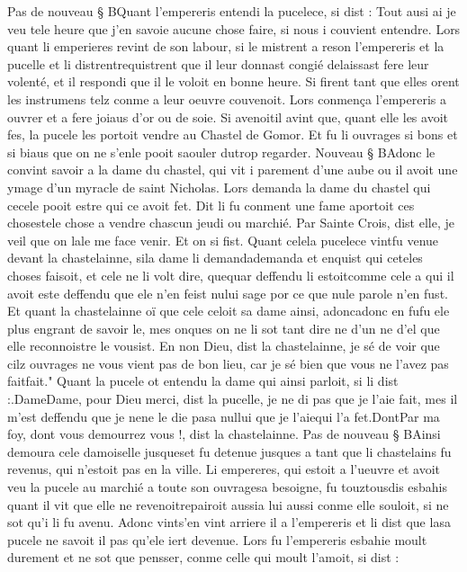 \documentclass{article}
\begin{document}
\begin{pages}
\pstart Pas de nouveau § BQuant l’empereris 
   entendi la pucelece, si dist :
   Tout ausi ai je veu tele heure que j’en savoie 
      aucune chose faire, si nous i couvient entendre.
   Lors quant li emperieres revint de son labour, si le mistrent a reson 
   l’empereris 
      et la pucelle 
   et li 
   distrentrequistrent que 
   il leur donnast congié delaissast fere leur 
      volenté, et il respondi que il le voloit 
         en bonne heure. Si firent tant que elles orent les instrumens telz 
   conme a leur oeuvre couvenoit. 
   Lors conmença l’empereris a ouvrer et a fere joiaus d’or ou de soie. 
   Si avenoitil avint que, quant elle les avoit fes, 
   la pucele les portoit vendre au Chastel de Gomor. 
   Et fu li ouvrages si bons et si biaus que on ne s’enle pooit 
   saouler dutrop regarder. 
   Nouveau § BAdonc le convint savoir a 
   la dame du chastel,
   qui vit i parement d’une aube ou il avoit une ymage d’un myracle de 
   saint Nicholas. Lors demanda la dame du chastel
   qui cecele pooit estre qui ce avoit fet. 
   Dit li fu conment une fame aportoit 
      ces chosestele chose 
      a vendre chascun jeudi ou marchié.
   Par Sainte Crois, dist elle, je veil que on lale 
      me face venir. Et on si fist. Quant celela pucelece 
   vintfu venue devant la chastelainne, 
   sila dame li 
   demandademanda et enquist 
   qui ceteles choses faisoit, 
   et cele ne li volt dire, quequar 
      deffendu li estoitcomme cele a qui il avoit este deffendu
   que ele n'en feist nului sage por ce que nule parole n'en fust.
   Et quant la chastelainne oï que cele celoit sa dame ainsi, 
   adoncadonc en fufu ele 
   plus engrant de savoir le, mes onques on ne li sot tant dire ne d’un ne d’el 
   que elle reconnoistre le vousist.
   En non Dieu, dist la chastelainne,
      je sé de voir que cilz ouvrages ne vous vient pas de bon lieu, car je sé bien que vous ne l’avez pas 
      faitfait." Quant la pucele ot entendu la dame qui ainsi parloit, 
         si li dist :.DameDame, pour Dieu merci, 
      dist la pucelle, 
      je ne di pas que je l’aie fait, mes il m’est deffendu que je nene le die 
      pasa nullui 
      que je l’aiequi l'a fet.DontPar ma foy, dont 
      vous demourrez vous !, dist la chastelainne. \pend
\pstart Pas de nouveau § BAinsi demoura 
   cele damoiselle 
   jusqueset fu detenue jusques a tant que
   li chastelains fu revenus, qui n’estoit pas en la ville.
   Li empereres, qui estoit a l’ueuvre et avoit veu la pucele 
   au marchié a toute son ouvragesa besoigne, fu 
   touztousdis esbahis quant il vit 
   que elle ne revenoitrepairoit 
   aussia lui aussi conme elle souloit, 
   si ne sot qu’i li fu avenu. Adonc vints'en vint arriere 
   il a l’empereris et li dist que
   lasa pucele 
      ne savoit il pas qu’ele iert devenue. 
   Lors fu l’empereris esbahie moult durement 
   et ne sot que pensser, conme celle qui moult l’amoit, si dist :
   

\end{pages}
\end{document}
